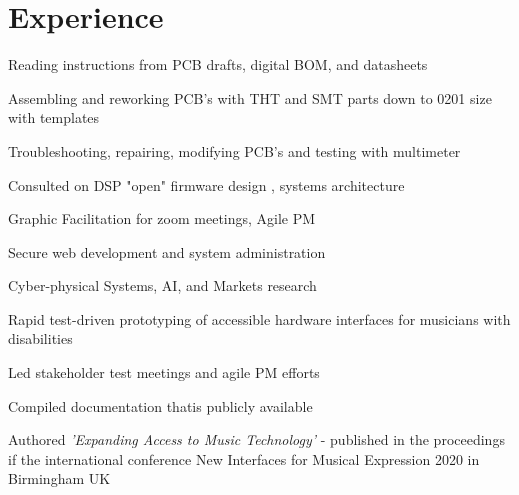 \documentclass[]{quinnJarvisHollandLatex}
\begin{document}
%
%
%
%

%
%

\begin{minipage}[t]{0.60\textwidth}


\section{Experience}
\vspace{\topsep} %
\begin{tightemize}
\item Reading instructions from PCB drafts, digital BOM, and datasheets
\item Assembling and reworking PCB's with THT and SMT parts down to 0201 size with templates
\item Troubleshooting, repairing, modifying PCB's and testing with multimeter 
\item Consulted on DSP "open" firmware design , systems architecture
\end{tightemize}
\begin{tightemize}
\item Graphic Facilitation for zoom meetings, Agile PM
\item Secure web development and system administration
\item Cyber-physical Systems, AI, and Markets research
\end{tightemize}
\sectionsep

\begin{tightemize}
\item Rapid test-driven prototyping of  accessible hardware interfaces for musicians with disabilities
\item Led stakeholder test meetings and agile PM efforts
\item Compiled documentation thatis publicly available
\item Authored \textit{'Expanding Access to Music Technology' } - published in the proceedings if the international conference New Interfaces for Musical Expression 2020 in Birmingham UK
\end{tightemize}
\sectionsep


\end{minipage}
\end{document}
